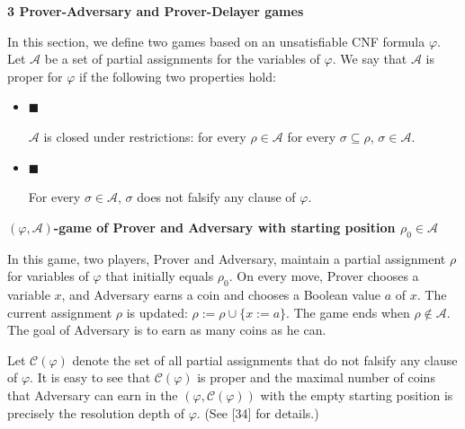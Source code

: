 \par\medskip\noindent\textbf{
3 Prover-Adversary and Prover-Delayer games}\par


In this section, we define two games based on an unsatisfiable CNF formula $\varphi$.
Let $\mathcal{A}$ be a set of partial assignments for the variables of $\varphi$.
We say that $\mathcal{A}$ is proper for $\varphi$ if the following two properties hold:\par


\begin{itemize}


\item 
$\blacksquare$ 


$\mathcal{A}$ is closed under restrictions: for every $\rho\in\mathcal{A}$
for every $\sigma\subseteq\rho$, $\sigma\in\mathcal{A}$.\par





\item 
$\blacksquare$ 


For every $\sigma\in\mathcal{A}$, $\sigma$ does not falsify any clause of $\varphi$.\par





\end{itemize}


\par\medskip\noindent\textbf{
$(\varphi,\mathcal{A})$-game of Prover and Adversary with starting position $\rho_{0}\in\mathcal{A}$
}\par


In this game, two players, Prover and Adversary, maintain a partial
assignment $\rho$ for variables of $\varphi$ that initially equals $\rho_{0}$.
On every move, Prover chooses a variable $x$, and Adversary earns a coin and chooses a Boolean
value $a$ of $x$.
The current assignment $\rho$ is updated: $\rho:=\rho\cup\{x:=a\}$.
The game ends when $\rho\notin\mathcal{A}$.
The goal of Adversary is to earn as many coins as he can.\par



Let $\mathcal{C}(\varphi)$ denote the set of all partial assignments that do not falsify
any clause of $\varphi$.
It is easy to see that $\mathcal{C}(\varphi)$ is proper and the maximal number of coins that
Adversary can earn in the $(\varphi,\mathcal{C}(\varphi))$ with the empty starting position
is precisely the resolution depth of $\varphi$.
(See [34] for details.)\par



